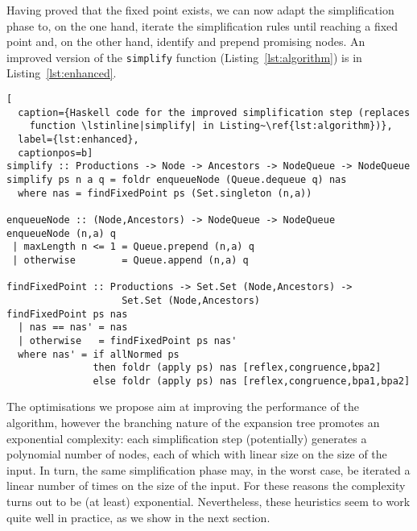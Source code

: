 Having proved that the fixed point exists, we can now adapt the
simplification phase to, on the one hand, iterate the simplification
rules until reaching a fixed point and, on the other hand, identify
and prepend promising nodes. An improved version of the
\lstinline|simplify| function (Listing~\ref{lst:algorithm}) is in
Listing~\ref{lst:enhanced}.

\begin{lstlisting}[
  caption={Haskell code for the improved simplification step (replaces
    function \lstinline|simplify| in Listing~\ref{lst:algorithm})},
  label={lst:enhanced},
  captionpos=b]
simplify :: Productions -> Node -> Ancestors -> NodeQueue -> NodeQueue
simplify ps n a q = foldr enqueueNode (Queue.dequeue q) nas
  where nas = findFixedPoint ps (Set.singleton (n,a))

enqueueNode :: (Node,Ancestors) -> NodeQueue -> NodeQueue
enqueueNode (n,a) q
 | maxLength n <= 1 = Queue.prepend (n,a) q
 | otherwise        = Queue.append (n,a) q

findFixedPoint :: Productions -> Set.Set (Node,Ancestors) -> 
                    Set.Set (Node,Ancestors)
findFixedPoint ps nas
  | nas == nas' = nas
  | otherwise   = findFixedPoint ps nas'
  where nas' = if allNormed ps
               then foldr (apply ps) nas [reflex,congruence,bpa2]
               else foldr (apply ps) nas [reflex,congruence,bpa1,bpa2]
\end{lstlisting}

The optimisations we propose aim at improving the performance of the
algorithm, however the branching nature of the expansion tree promotes
an exponential complexity: each simplification step (potentially)
generates a polynomial number of nodes, each of which with linear size
on the size of the input.  In turn, the same simplification phase may,
in the worst case, be iterated a linear number of times on the size of
the input.  For these reasons the complexity turns out to be (at least)
exponential.  Nevertheless, these heuristics seem to work quite well
in practice, as we show in the next section.

